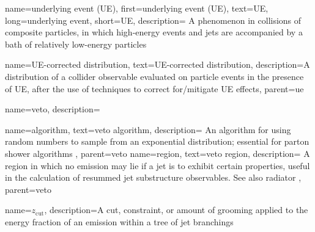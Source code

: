 {
  name=underlying event (UE),
  first=underlying event (UE),
  text=UE,
  long=underlying event,
  short=UE,
  description={
      A phenomenon in collisions of composite particles, in which high-energy events and jets are accompanied by a bath of relatively low-energy particles
  }
}

{
    name=UE-corrected distribution,
    text=UE-corrected distribution,
    description={A distribution of a collider observable evaluated on particle events in the presence of UE, after the use of techniques to correct for/mitigate UE effects},
    parent=ue
}


{
    name=veto,
    description={}
}

{
    name=algorithm,
    text=veto algorithm,
    description={
        An algorithm for using random numbers to sample from an exponential distribution;
        essential for parton shower algorithms
    },
    parent=veto
}
{
    name=region,
    text=veto region,
    description={
        A region in which no emission may lie if a jet is to exhibit certain properties, useful in the calculation of resummed jet substructure observables.
        See also radiator
    },
    parent=veto
}

{
  name=\ensuremath{z_{\text{cut}}},
  description={A cut, constraint, or amount of grooming applied to the energy fraction of an emission within a tree of jet branchings}
}
